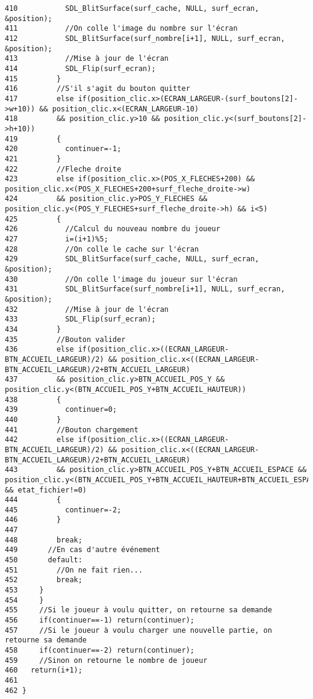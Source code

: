 \begin{Code}
\begin{verbatim}
410           SDL_BlitSurface(surf_cache, NULL, surf_ecran, &position);
411           //On colle l'image du nombre sur l'écran
412           SDL_BlitSurface(surf_nombre[i+1], NULL, surf_ecran, &position);
413           //Mise à jour de l'écran
414           SDL_Flip(surf_ecran);
415         }
416         //S'il s'agit du bouton quitter
417         else if(position_clic.x>(ECRAN_LARGEUR-(surf_boutons[2]->w+10)) && position_clic.x<(ECRAN_LARGEUR-10)
418         && position_clic.y>10 && position_clic.y<(surf_boutons[2]->h+10))
419         {
420           continuer=-1;
421         }
422         //Fleche droite
423         else if(position_clic.x>(POS_X_FLECHES+200) && position_clic.x<(POS_X_FLECHES+200+surf_fleche_droite->w)
424         && position_clic.y>POS_Y_FLECHES && position_clic.y<(POS_Y_FLECHES+surf_fleche_droite->h) && i<5)
425         {
426           //Calcul du nouveau nombre du joueur
427           i=(i+1)%5;
428           //On colle le cache sur l'écran
429           SDL_BlitSurface(surf_cache, NULL, surf_ecran, &position);
430           //On colle l'image du joueur sur l'écran
431           SDL_BlitSurface(surf_nombre[i+1], NULL, surf_ecran, &position);
432           //Mise à jour de l'écran
433           SDL_Flip(surf_ecran);
434         }
435         //Bouton valider
436         else if(position_clic.x>((ECRAN_LARGEUR-BTN_ACCUEIL_LARGEUR)/2) && position_clic.x<((ECRAN_LARGEUR-BTN_ACCUEIL_LARGEUR)/2+BTN_ACCUEIL_LARGEUR)
437         && position_clic.y>BTN_ACCUEIL_POS_Y && position_clic.y<(BTN_ACCUEIL_POS_Y+BTN_ACCUEIL_HAUTEUR))
438         {
439           continuer=0;
440         }
441         //Bouton chargement
442         else if(position_clic.x>((ECRAN_LARGEUR-BTN_ACCUEIL_LARGEUR)/2) && position_clic.x<((ECRAN_LARGEUR-BTN_ACCUEIL_LARGEUR)/2+BTN_ACCUEIL_LARGEUR)
443         && position_clic.y>BTN_ACCUEIL_POS_Y+BTN_ACCUEIL_ESPACE && position_clic.y<(BTN_ACCUEIL_POS_Y+BTN_ACCUEIL_HAUTEUR+BTN_ACCUEIL_ESPACE) && etat_fichier!=0)
444         {
445           continuer=-2;
446         }
447 
448         break;
449       //En cas d'autre événement
450       default:
451         //On ne fait rien...
452         break;
453     }
454     }
455     //Si le joueur à voulu quitter, on retourne sa demande
456     if(continuer==-1) return(continuer);
457     //Si le joueur à voulu charger une nouvelle partie, on retourne sa demande
458     if(continuer==-2) return(continuer);
459     //Sinon on retourne le nombre de joueur
460   return(i+1);
461 
462 }
\end{verbatim}\end{Code}


